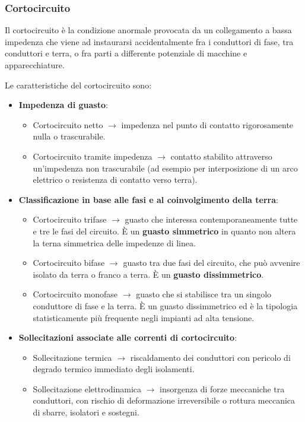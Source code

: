\subsubsection{Cortocircuito}
Il cortocircuito è la condizione anormale provocata da un collegamento a bassa impedenza che viene ad instaurarsi accidentalmente fra i conduttori di fase, tra conduttori e terra, o fra parti a differente potenziale di macchine e apparecchiature.

Le caratteristiche del cortocircuito sono:
\begin{itemize}
    \item \textbf{Impedenza di guasto}:
    \begin{itemize}
        \item Cortocircuito netto $\rightarrow$ impedenza nel punto di contatto rigorosamente nulla o trascurabile.
        \item Cortocircuito tramite impedenza $\rightarrow$ contatto stabilito attraverso un'impedenza non trascurabile (ad esempio per interposizione di un arco elettrico o resistenza di contatto verso terra).
    \end{itemize}
    \item \textbf{Classificazione in base alle fasi e al coinvolgimento della terra}:
    \begin{itemize}
        \item Cortocircuito trifase $\rightarrow$ guasto che interessa contemporaneamente tutte e tre le fasi del circuito. È un \textbf{guasto simmetrico} in quanto non altera la terna simmetrica delle impedenze di linea.
        \item Cortocircuito bifase $\rightarrow$ guasto tra due fasi del circuito, che può avvenire isolato da terra o franco a terra. È un \textbf{guasto dissimmetrico}.
        \item Cortocircuito monofase $\rightarrow$ guasto che si stabilisce tra un singolo conduttore di fase e la terra. È un guasto dissimmetrico ed è la tipologia statisticamente più frequente negli impianti ad alta tensione.
    \end{itemize}
    \newpage
    \item \textbf{Sollecitazioni associate alle correnti di cortocircuito}:
    \begin{itemize}
        \item Sollecitazione termica $\rightarrow$ riscaldamento dei conduttori con pericolo di degrado termico immediato degli isolamenti.
        \item Sollecitazione elettrodinamica $\rightarrow$ insorgenza di forze meccaniche tra conduttori, con rischio di deformazione irreversibile o rottura meccanica di sbarre, isolatori e sostegni.

\end{itemize}
\end{itemize}
